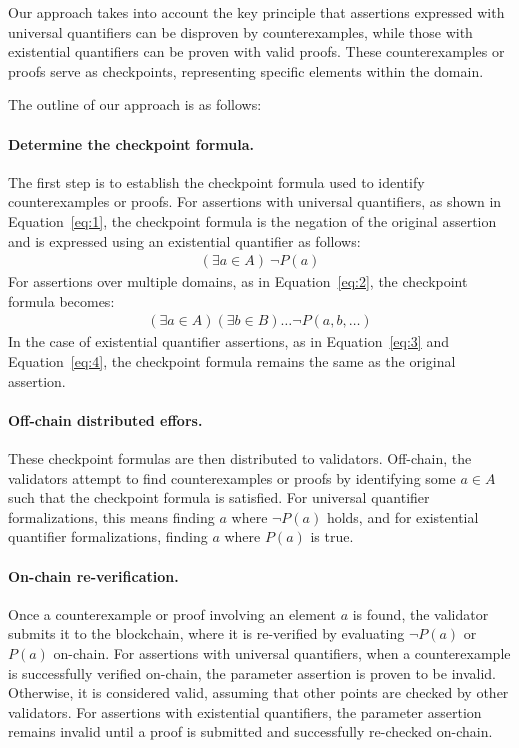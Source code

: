 \documentclass[runningheads]{llncs}
\begin{document}
Our approach takes into account the key principle that assertions expressed with universal quantifiers can be disproven by counterexamples, while those with existential quantifiers can be proven with valid proofs. These counterexamples or proofs serve as checkpoints, representing specific elements within the domain. 

The outline of our approach is as follows:
\paragraph{\textbf{Determine the checkpoint formula.}}
The first step is to establish the checkpoint formula used to identify counterexamples or proofs. For assertions with universal quantifiers, as shown in Equation~\ref{eq:1}, the checkpoint formula is the negation of the original assertion and is expressed using an existential quantifier as follows: 
\begin{gather}
\label{eq:9}
(\exists a \in A) \ \neg P(a)
\end{gather}
For assertions over multiple domains, as in Equation~\ref{eq:2}, the checkpoint formula becomes:
\begin{gather}
\label{eq:10}
(\exists a \in A) (\exists b \in B) \dots  \neg P(a, b, \dots)
\end{gather}
In the case of existential quantifier assertions, as in Equation~\ref{eq:3} and Equation~\ref{eq:4}, the checkpoint formula remains the same as the original assertion.
\paragraph{\textbf{Off-chain distributed effors.}}These checkpoint formulas are then distributed to validators. Off-chain, the validators attempt to find counterexamples or proofs by identifying some \( a \in A \) such that the checkpoint formula is satisfied. For universal quantifier formalizations, this means finding \( a \) where \( \neg P(a) \) holds, and for existential quantifier formalizations, finding \( a \) where \( P(a) \) is true.
\paragraph{\textbf{On-chain re-verification.}} Once a counterexample or proof involving an element \( a \) is found, the validator submits it to the blockchain, where it is re-verified by evaluating \( \neg P(a) \) or \( P(a) \) on-chain. For assertions with universal quantifiers, when a counterexample is successfully verified on-chain, the parameter assertion is proven to be invalid. Otherwise, it is considered valid, assuming that other points are checked by other validators. For assertions with existential quantifiers, the parameter assertion remains invalid until a proof is submitted and successfully re-checked on-chain.
\end{document}
